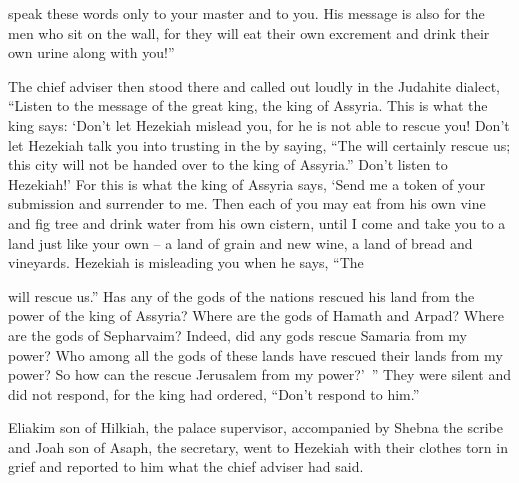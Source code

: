 {speak
these
words
only to your master
and to you. His message is also for the men
who sit
on
the wall,
for they will eat
their own excrement
and drink
their own urine
along with you!”
\par }{\PP {}The chief adviser
then stood
there and called out
loudly
in the Judahite dialect, “Listen
to the message
of the great
king,
the king
of Assyria.
This is what
the king
says: ‘Don’t
let Hezekiah
mislead
you, for
he is not
able
to rescue you!
Don’t
let Hezekiah
talk you into
trusting
in the
{}
by saying,
“The
{}
will certainly rescue
us; this
city
will not
be handed
over to the king
of Assyria.”
Don’t
listen
to
Hezekiah!’ For
this is what
the king
of Assyria
says,
‘Send
me a token of your submission
and surrender
to
me. Then each
of you may eat
from his own
vine
and fig tree
and drink
water
from his own
cistern,
until
I come
and take
you to
a land just like your own – a land of grain and new wine, a land of bread and vineyards.
Hezekiah
is misleading
you when he says,
“The

{}
will rescue
us.”
Has any
of the gods
of the nations
rescued
his land
from the power
of the king
of Assyria?
Where
are the gods
of Hamath
and Arpad? Where
are the gods
of Sepharvaim? Indeed,
did any gods rescue
Samaria
from my power?
Who
among all
the gods
of these
lands
have
rescued
their lands
from my power? So how can the
{}
rescue
Jerusalem
from my power?’ ”
They were silent
and did not
respond,
for
the king
had ordered,
“Don’t
respond to him.”
\par }{\PP {}Eliakim
son
of Hilkiah,
the palace supervisor,
accompanied
by Shebna
the scribe
and Joah
son
of Asaph,
the secretary,
went to
Hezekiah
with their clothes
torn
in grief and reported
to him what
the chief adviser had said.

}

